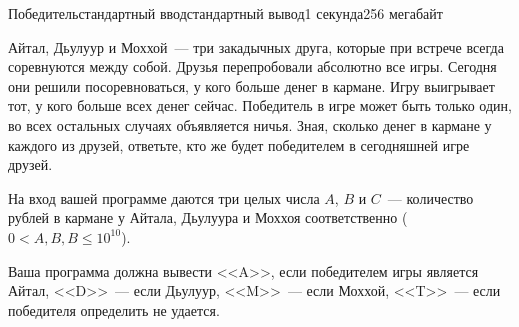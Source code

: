 \begin{problem}{Победитель}{стандартный ввод}{стандартный вывод}{1 секунда}{256 мегабайт}

Айтал, Дьулуур и Моххой~--- три закадычных друга, которые при встрече всегда соревнуются между собой. Друзья перепробовали абсолютно все игры. Сегодня они решили посоревноваться, у кого больше денег в кармане. Игру выигрывает тот, у кого больше всех денег сейчас. Победитель в игре может быть только один, во всех остальных случаях объявляется ничья. Зная, сколько денег в кармане у каждого из друзей, ответьте, кто же будет победителем в сегодняшней игре друзей.

\InputFile
На вход вашей программе даются три целых числа $A$, $B$ и $C$~--- количество рублей в кармане у Айтала, Дьулуура и Моххоя соответственно ($0<A,B,B \leq 10^{10}$).

\OutputFile
Ваша программа должна вывести <<A>>, если победителем игры является Айтал, <<D>>~--- если Дьулуур, <<M>>~--- если Моххой, <<T>>~--- если победителя определить не удается.

\Examples

\begin{example}
%
%
\end{example}

\end{problem}

